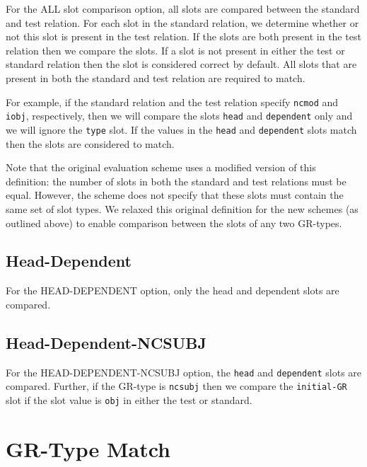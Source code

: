 \documentclass[10pt]{article}
\newcommand{\stt}[1]{{\small\texttt{#1}}}
\begin{document}
For the ALL slot comparison option, 
all slots are compared between the standard and test
relation.
For each slot in the standard relation, we determine
whether or not this slot is present in the test relation.
If the slots are both present in the test relation then we
compare the slots.
If a slot is not present in either the test or standard
relation then the slot is considered correct by
default.
All slots that are present in both the standard and test
relation are required to match.

For example, if the standard relation and the
test relation specify \stt{ncmod} and \stt{iobj}, respectively,
then we will compare the slots \stt{head} and \stt{dependent}
only and we will ignore the \stt{type} slot. If the values in the
\stt{head} and \stt{dependent} slots match
then the slots are considered to match.

Note that the original evaluation scheme uses a modified version of this
definition: the number of slots in both the standard and test relations
must be equal. However, the scheme does not specify that these slots must
contain the same set of slot types. We relaxed this original definition for the
new schemes (as outlined above) to enable comparison between 
the slots of any two GR-types.

\subsection{Head-Dependent}

For the HEAD-DEPENDENT option, only the head and dependent slots
are compared.

\subsection{Head-Dependent-NCSUBJ}

For the HEAD-DEPENDENT-NCSUBJ option, the \stt{head} and 
\stt{dependent} slots are compared. 
Further, if the GR-type is \stt{ncsubj} then
we compare the \stt{initial-GR} slot if the slot value 
is \stt{obj} in either the test or standard.

\section{GR-Type Match}
\label{grmatch}
\end{document}
